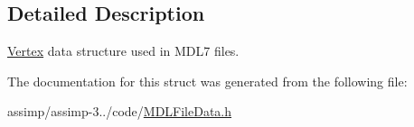 \subsection{Detailed Description}
\hyperlink{struct_assimp_1_1_m_d_l_1_1_vertex}{Vertex} data structure used in M\+D\+L7 files. 

The documentation for this struct was generated from the following file\+:\begin{DoxyCompactItemize}
\item 
assimp/assimp-\/3../code/\hyperlink{_m_d_l_file_data_8h}{M\+D\+L\+File\+Data.\+h}\end{DoxyCompactItemize}
